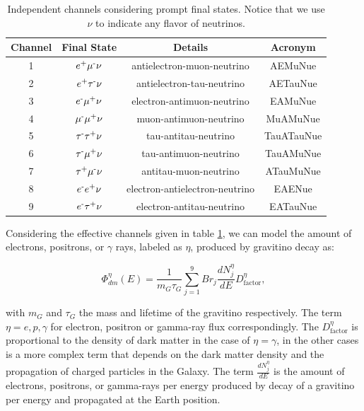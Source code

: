 \documentclass[a4paper,11pt]{article}
\begin{document}
\begin{table}
\centering{}%
\begin{tabular}{|c|c|c|c|}
\hline 
Channel & Final State & Details & Acronym\tabularnewline
\hline 
\hline 
1 & $e\text{\textsuperscript{+}}\mu\text{\textsuperscript{-}}\nu$ & antielectron-muon-neutrino & AEMuNue\tabularnewline
\hline 
2 & $e\text{\textsuperscript{+}}\tau\text{\textsuperscript{-}}\nu$ & antielectron-tau-neutrino & AETauNue\tabularnewline
\hline 
3 & $e\text{\textsuperscript{-}}\mu\text{\textsuperscript{+}}\nu$ & electron-antimuon-neutrino & EAMuNue\tabularnewline
\hline 
4 & $\mu\text{\textsuperscript{-}}\mu\text{\textsuperscript{+}}\nu$ & muon-antimuon-neutrino & MuAMuNue\tabularnewline
\hline 
5 & $\tau\text{\textsuperscript{-}}\tau\text{\textsuperscript{+}}\nu$ & tau-antitau-neutrino & TauATauNue\tabularnewline
\hline 
6 & $\tau\text{\textsuperscript{-}}\mu\text{\textsuperscript{+}}\nu$ & tau-antimuon-neutrino & TauAMuNue\tabularnewline
\hline 
7 & $\tau\text{\textsuperscript{+}}\mu\text{\textsuperscript{-}}\nu$ & antitau-muon-neutrino & ATauMuNue\tabularnewline
\hline 
8 & $e\text{\textsuperscript{-}}e\text{\textsuperscript{+}}\nu$ & electron-antielectron-neutrino & EAENue\tabularnewline
\hline 
9 & $e\text{\textsuperscript{-}}\tau\text{\textsuperscript{+}}\nu$ & electron-antitau-neutrino & EATauNue\tabularnewline
\hline 
\end{tabular}\caption{\label{tab:Independent-channels-prompt-final-states}Independent channels
considering prompt final states. Notice that we use $\nu$ to indicate
any flavor of neutrinos. }
\end{table}

Considering the effective channels given in table \ref{tab:Independent-channels-prompt-final-states}, we can  model the amount of electrons, positrons, or $\gamma$ rays, labeled as $\eta$, produced by gravitino decay as:

\begin{equation}
\Phi_{dm}^{\eta}(E) = \frac{1}{m_G \tau_G} \sum_{j=1}^9 {Br_j \frac{dN_j^{\eta}}{dE}} D^{\eta}_{\text{factor}},
\label{dm-flux}
\end{equation}

\noindent with $m_G$ and $\tau_G$ the mass and lifetime of the gravitino respectively. The term $\eta = e, p,\gamma$ for electron, positron or gamma-ray flux correspondingly. The $D^{\eta}_{\text{factor}}$ is proportional to the density of dark matter in the case of $\eta=\gamma$, in the other cases is a more complex term that depends on the dark matter density and the propagation of charged particles in the Galaxy. The term $\frac{dN_j^{\eta}}{dE}$ is the amount of electrons, positrons, or gamma-rays per energy produced by decay of a gravitino per energy and propagated at the Earth position. 
\end{document}
